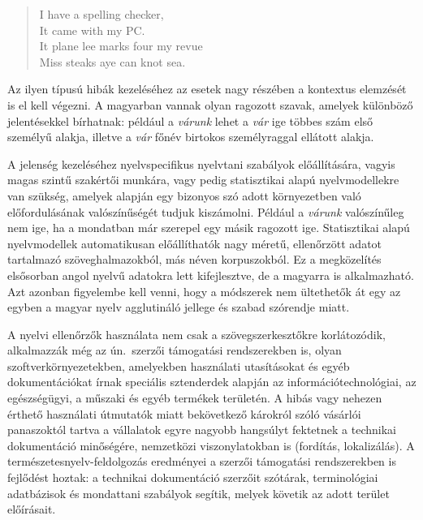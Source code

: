 \begin{multicols}{2}
  \begin{quote}
    I have a spelling checker,\\
    It came with my PC.\\
    It plane lee marks four my revue\\
    Miss steaks aye can knot sea.
  \end{quote}

  Az ilyen típusú hibák kezeléséhez az esetek nagy részében a kontextus elemzését is el kell végezni. A magyarban vannak olyan ragozott szavak, amelyek különböző jelentésekkel bírhatnak: például a \textit{várunk} lehet a \textit{vár} ige többes szám első személyű alakja, illetve a \textit{vár} főnév birtokos személyraggal ellátott alakja. 

  A jelenség kezeléséhez nyelvspecifikus nyelvtani szabályok előállítására, vagyis magas szintű szakértői munkára, vagy pedig  statisztikai alapú nyelvmodellekre van szükség, amelyek alapján egy bizonyos szó adott környezetben való előfordulásának valószínűségét tudjuk kiszámolni. Például a \textit{várunk} valószínűleg nem ige, ha a mondatban már szerepel egy másik ragozott ige. Statisztikai alapú nyelvmodellek automatikusan előállíthatók nagy méretű, ellenőrzött adatot tartalmazó szöveghalmazokból, más néven korpuszokból. Ez a megközelítés elsősorban angol nyelvű adatokra lett kifejlesztve, de a magyarra is alkalmazható. Azt azonban figyelembe kell venni, hogy a módszerek nem ültethetők át egy az egyben a magyar nyelv agglutináló jellege és szabad szórendje miatt.


  A nyelvi ellenőrzők használata nem csak a szövegszerkesztőkre korlátozódik, al\-kal\-maz\-zák még az ún.\ szerzői támogatási rendszerekben is, olyan szoftverkörnyezetekben, amelyekben használati utasításokat és egyéb dokumentációkat írnak speciális szten\-der\-dek alapján az információtechnológiai, az egészségügyi, a műszaki és egyéb termékek területén. A hibás vagy nehezen érthető használati útmutatók miatt bekövetkező károkról szóló vásárlói panaszoktól tartva a vállalatok egyre nagyobb hangsúlyt fektetnek a technikai dokumentáció minőségére, nemzetközi viszonylatokban is (fordítás, lokalizálás). A természetesnyelv-feldolgozás ered\-mé\-nyei a szerzői támogatási rendszerekben is fejlődést hoztak: a technikai dokumentáció szerzőit szótárak, terminológiai adatbázisok és mondattani szabályok segítik, melyek követik az adott terület előírásait.


\end{multicols}
